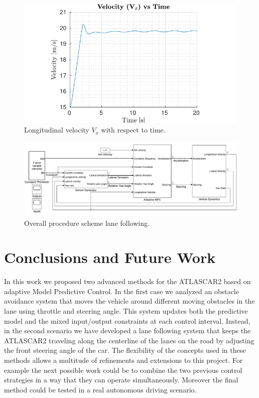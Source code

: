 \documentclass[conference, 11pt]{IEEEtran}
\begin{document}
\begin{figure}[!h]
	\centering
	\hspace*{-0.5in}
	\includegraphics[width=1.29\columnwidth]{../../MATLAB/lane_following/figure/LongitudinalVelocityVsTime.pdf}
	\caption{Longitudinal velocity $V_x$ with respect to time.}
	\label{fig:longitudinal_velocity_laneFollowing}
\end{figure}


\begin{figure}[!h]
	\centering
	\includegraphics[width=\textwidth]{./figure/lane_following_AMPC.pdf}
	\caption{Overall procedure scheme lane following.}
	\label{fig:scheme_lane_following}
\end{figure}


\section{Conclusions and Future Work}
In this work we proposed two advanced methods for the ATLASCAR2 based on adaptive Model Predictive Control. In the first case we analyzed an obstacle avoidance system that moves the vehicle around different moving obstacles in the lane using throttle and steering angle. This system updates both the predictive model and the mixed input/output constraints at each control interval. Instead, in the second scenario  we have developed a lane following system that keeps the ATLASCAR2 traveling along the centerline of the lanes on the road by adjusting the front steering angle of the car. The flexibility of the concepts used in these methods allows a multitude of refinements and extensions to this project. For example the next possible work could be to combine the two previous control strategies in a way that they can operate simultaneously. Moreover the final method could be tested in a real autonomous driving scenario.
\end{document}
